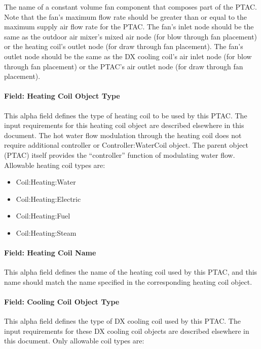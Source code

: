 The name of a constant volume fan component that composes part of the PTAC. Note that the fan's maximum flow rate should be greater than or equal to the maximum supply air flow rate for the PTAC. The fan's inlet node should be the same as the outdoor air mixer's mixed air node (for blow through fan placement) or the heating coil's outlet node (for draw through fan placement). The fan's outlet node should be the same as the DX cooling coil's air inlet node (for blow through fan placement) or the PTAC's air outlet node (for draw through fan placement).

\paragraph{Field: Heating Coil Object Type}\label{field-heating-coil-object-type-3-000}

This alpha field defines the type of heating coil to be used by this PTAC. The input requirements for this heating coil object are described elsewhere in this document. The hot water flow modulation through the heating coil does not require additional controller or Controller:WaterCoil object. The parent object (PTAC) itself provides the ``controller'' function of modulating water flow. Allowable heating coil types are:

\begin{itemize}
\item
  Coil:Heating:Water
\item
  Coil:Heating:Electric
\item
  Coil:Heating:Fuel
\item
  Coil:Heating:Steam
\end{itemize}

\paragraph{Field: Heating Coil Name}\label{field-heating-coil-name-3-000}

This alpha field defines the name of the heating coil used by this PTAC, and this name should match the name specified in the corresponding heating coil object.

\paragraph{Field: Cooling Coil Object Type}\label{field-cooling-coil-object-type-3-000}

This alpha field defines the type of DX cooling coil used by this PTAC. The input requirements for these DX cooling coil objects are described elsewhere in this document. Only allowable coil types are:

